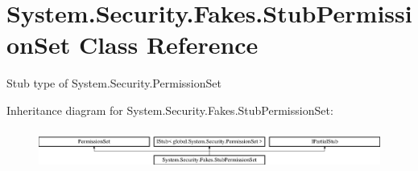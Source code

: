 \hypertarget{class_system_1_1_security_1_1_fakes_1_1_stub_permission_set}{\section{System.\-Security.\-Fakes.\-Stub\-Permission\-Set Class Reference}
\label{class_system_1_1_security_1_1_fakes_1_1_stub_permission_set}
}


Stub type of System.\-Security.\-Permission\-Set 


Inheritance diagram for System.\-Security.\-Fakes.\-Stub\-Permission\-Set\-:\begin{figure}[H]
\begin{center}
\leavevmode
\includegraphics[height=1.314554cm]{class_system_1_1_security_1_1_fakes_1_1_stub_permission_set}
\end{center}
\end{figure}
